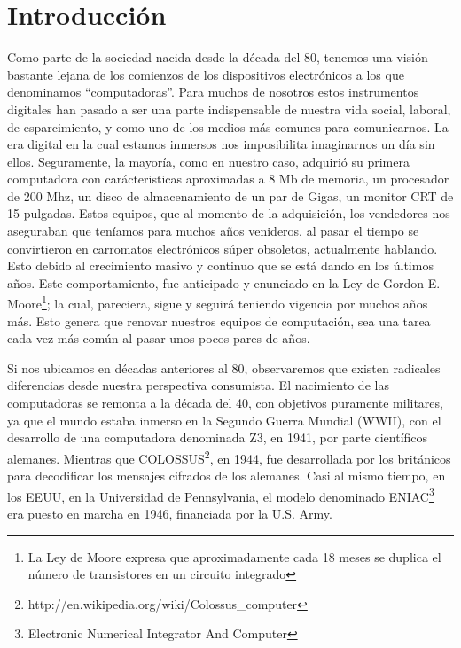 \documentclass[%
 	final,
%
	notitlepage,
	narroweqnarray,
	inline,
 	twoside,
	]{ieee}
\newcommand{\link}[1]{\textit{}{#1}}
\begin{document}

\section{Introducci\'on}

Como parte de la sociedad nacida desde la d\'ecada del 80, tenemos una visi\'on bastante lejana de los comienzos de los dispositivos electr\'onicos a los que denominamos ``computadoras''. Para muchos de nosotros estos instrumentos digitales han pasado a ser una parte indispensable de nuestra vida social, laboral, de esparcimiento, y como uno de los medios m\'as comunes para comunicarnos. La era digital en la cual estamos inmersos nos imposibilita imaginarnos un d\'ia sin ellos. 
Seguramente, la mayor\'ia, como en nuestro caso, adquiri\'o su primera computadora con car\'acteristicas aproximadas a 8 Mb de memoria, un procesador de 200 Mhz, un disco de almacenamiento de un par de Gigas, un monitor CRT de 15 pulgadas. Estos equipos, que al momento de la adquisici\'on, los vendedores nos aseguraban que ten\'iamos para muchos a\~nos venideros, al pasar el tiempo se convirtieron en carromatos electr\'onicos s\'uper obsoletos, actualmente hablando. Esto debido al crecimiento masivo y continuo que se est\'a dando en los \'ultimos a\~nos.
Este comportamiento, fue anticipado y enunciado en la Ley de Gordon E. Moore\footnote{La Ley de Moore expresa que aproximadamente cada 18 meses se duplica el n\'umero de transistores en un circuito integrado\cite{LeyMoore}}; la cual, pareciera, sigue y seguir\'a teniendo vigencia por muchos a\~nos m\'as. Esto genera que renovar nuestros equipos de computaci\'on, sea una tarea cada vez m\'as com\'un al pasar unos pocos pares de a\~nos.

Si nos ubicamos en d\'ecadas anteriores al 80, observaremos que existen radicales diferencias desde nuestra perspectiva consumista.
El nacimiento de las computadoras se remonta a la d\'ecada del 40, con objetivos puramente militares, ya que el mundo estaba inmerso en la Segundo Guerra Mundial (WWII), con el desarrollo de una computadora denominada Z3\cite{z3}, en 1941, por parte cient\'ificos alemanes. Mientras que COLOSSUS\footnote{\link{http://en.wikipedia.org/wiki/Colossus\_computer}}, en 1944, fue desarrollada por los brit\'anicos para decodificar los mensajes cifrados de los alemanes. Casi al mismo tiempo, en los EEUU, en la Universidad de Pennsylvania, el modelo denominado ENIAC\footnote{Electronic Numerical Integrator And Computer\cite{eniac}} era puesto en marcha en 1946, financiada por la U.S. Army.
\end{document}
